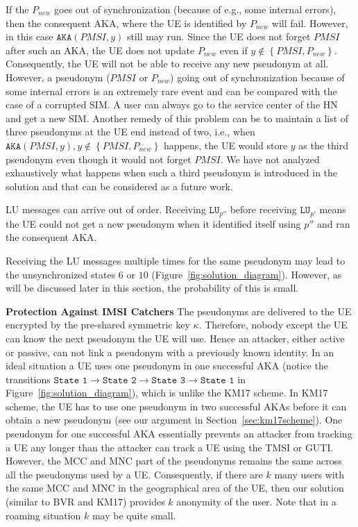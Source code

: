 \documentclass{llncs} %
\begin{document}
If the $P_{new}$ goes out of synchronization (because of e.g., some internal errors), then the consequent AKA, where the UE is identified by $P_{new}$ will fail.  However, in this case $\texttt{AKA}(PMSI,y)$ still may run. Since the UE does not forget $PMSI$ after such an AKA, the UE does not update $P_{new}$ even if $y \notin \left\lbrace PMSI,P_{new} \right\rbrace$. Consequently, the UE will not be able to receive any new pseudonym at all. However, a pseudonym ($PMSI$ or $P_{new}$) going out of synchronization because of some internal errors is an extremely rare event and can be compared with the case of a corrupted SIM. A user can always go to the service center of the HN and get a new SIM. Another remedy of this problem can be to maintain a list of three pseudonyms at the UE end instead of two, i.e., when $\texttt{AKA}(PMSI,y), y \notin \left\lbrace PMSI,P_{new} \right\rbrace$ happens, the UE would store $y$ as the third pseudonym even though it would not forget $PMSI$.  We have not analyzed exhaustively what happens when such a third pseudonym is introduced in the solution and that can be considered as a future work.

LU messages can arrive out of order. Receiving $\texttt{LU}_{p''}$ before receiving $\texttt{LU}_{p'}$ means the UE could not get a new pseudonym when it identified itself using $p''$ and ran the consequent AKA. 

Receiving the LU messages multiple times for the same pseudonym may lead to the unsynchronized states $6$ or $10$ (Figure~\ref{fig:solution_diagram}). However, as will be discussed later in this section, the probability of this is small.

\textbf{Protection Against IMSI Catchers} The pseudonyms are delivered to the UE encrypted by the pre-shared symmetric key $\kappa$. Therefore, nobody except the UE can know the next pseudonym the UE will use. Hence an attacker, either active or passive, can not link a pseudonym with a previously known identity. In an ideal situation a UE uses one pseudonym in one successful AKA (notice the transitions $ \texttt{State 1} \rightarrow \texttt{State 2} \rightarrow \texttt{State 3} \rightarrow \texttt{State 1}$ in Figure~\ref{fig:solution_diagram}), which is unlike the KM17 scheme. In KM17 scheme, the UE has to use one pseudonym in two successful AKAs before it can obtain a new pseudonym (see our argument in Section~\ref{sec:km17scheme}). One pseudonym for one successful AKA essentially prevents an attacker from tracking a UE any longer than the attacker can track a UE using the TMSI or GUTI. However, the MCC and MNC part of the pseudonyms remains the same across all the pseudonyms used by a UE. Consequently, if there are $k$ many users with the same MCC and MNC in the geographical area of the UE, then our solution (similar to BVR and KM17) provides $k$ anonymity of the user. Note that in a roaming situation $k$ may be quite small.
\end{document}
